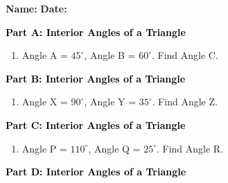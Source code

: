 \documentclass[12pt, letterpaper, fleqn]{article}
\begin{document}
\textbf{Name:} \underline{\hspace{5cm}}
\hfill
\textbf{Date:} \underline{\hspace{3cm}}\\

\begin{tcolorbox}[colback=customteal!20]
\large\textcolor{black}{\textbf{Part A: Interior Angles of a Triangle}}
\end{tcolorbox}

\vspace{3mm}

\begin{enumerate}[itemsep=2.5cm, leftmargin=0.6cm]
\item Angle A = $45^\circ$, Angle B = $60^\circ$. Find Angle C.
\end{enumerate}

\newpage

\begin{tcolorbox}[colback=customteal!20]
\large\textcolor{black}{\textbf{Part B: Interior Angles of a Triangle}}
\end{tcolorbox}

\vspace{3mm}

\begin{enumerate}[itemsep=2.5cm, leftmargin=0.6cm, resume]
\item Angle X = $90^\circ$, Angle Y = $35^\circ$. Find Angle Z.
\end{enumerate}

\newpage

\begin{tcolorbox}[colback=customteal!20]
\large\textcolor{black}{\textbf{Part C: Interior Angles of a Triangle}}
\end{tcolorbox}

\vspace{3mm}

\begin{enumerate}[itemsep=2.5cm, leftmargin=0.6cm, resume]
\item Angle P = $110^\circ$, Angle Q = $25^\circ$. Find Angle R.
\end{enumerate}

\newpage

\begin{tcolorbox}[colback=customteal!20]
\large\textcolor{black}{\textbf{Part D: Interior Angles of a Triangle}}
\end{tcolorbox}
\end{document}
